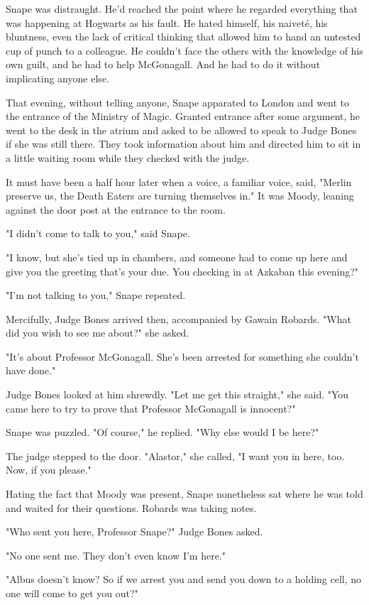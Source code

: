 \documentclass[a4paper,11pt]{article}
\begin{document}
Snape was distraught. He'd reached the point where he regarded everything that was happening at Hogwarts as his fault. He hated himself, his naiveté, his bluntness, even the lack of critical thinking that allowed him to hand an untested cup of punch to a colleague. He couldn't face the others with the knowledge of his own guilt, and he had to help McGonagall. And he had to do it without implicating anyone else.

That evening, without telling anyone, Snape apparated to London and went to the entrance of the Ministry of Magic. Granted entrance after some argument, he went to the desk in the atrium and asked to be allowed to speak to Judge Bones if she was still there. They took information about him and directed him to sit in a little waiting room while they checked with the judge.

It must have been a half hour later when a voice, a familiar voice, said, "Merlin preserve us, the Death Eaters are turning themselves in." It was Moody, leaning against the door post at the entrance to the room.

"I didn't come to talk to you," said Snape.

"I know, but she's tied up in chambers, and someone had to come up here and give you the greeting that's your due. You checking in at Azkaban this evening?"

"I'm not talking to you," Snape repeated.

Mercifully, Judge Bones arrived then, accompanied by Gawain Robards. "What did you wish to see me about?" she asked.

"It's about Professor McGonagall. She's been arrested for something she couldn't have done."

Judge Bones looked at him shrewdly. "Let me get this straight," she said. "You came here to try to prove that Professor McGonagall is innocent?"

Snape was puzzled. "Of course," he replied. "Why else would I be here?"

The judge stepped to the door. "Alastor," she called, "I want you in here, too. Now, if you please."

Hating the fact that Moody was present, Snape nonetheless sat where he was told and waited for their questions. Robards was taking notes.

"Who sent you here, Professor Snape?" Judge Bones asked.

"No one sent me. They don't even know I'm here."

"Albus doesn't know? So if we arrest you and send you down to a holding cell, no one will come to get you out?"
\end{document}

